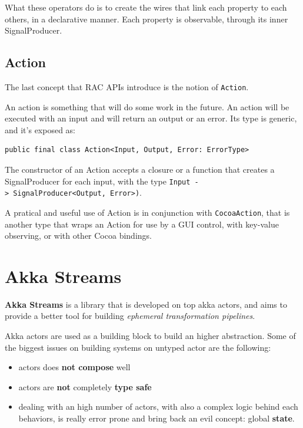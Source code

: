 What these operators do is to create the wires that link each property
to each others, in a declarative manner. Each property is observable,
through its inner SignalProducer.


\subsection{Action}\label{action}

The last concept that RAC APIs introduce is the notion of
\texttt{Action}.

An action is something that will do some work in the future. An action
will be executed with an input and will return an output or an error.
Its type is generic, and it's exposed as:

\begin{verbatim}
public final class Action<Input, Output, Error: ErrorType>
\end{verbatim}

The constructor of an Action accepts a closure or a function that
creates a SignalProducer for each input, with the type
\texttt{Input\ -\textgreater{}\ SignalProducer\textless{}Output,\ Error\textgreater{})}.

A pratical and useful use of Action is in conjunction with
\texttt{CocoaAction}, that is another type that wraps an Action for use
by a GUI control, with key-value observing, or with other Cocoa
bindings.


\section{Akka Streams}\label{akka-streams}

\textbf{Akka Streams} is a library that is developed on top akka actors,
and aims to provide a better tool for building \emph{ephemeral
transformation pipelines}.

Akka actors are used as a building block to build an higher abstraction.
Some of the biggest issues on building systems on untyped actor are the
following:

\begin{itemize}
\itemsep1pt\parskip0pt
\item
  actors does \textbf{not compose} well
\item
  actors are \textbf{not} completely \textbf{type safe}
\item
  dealing with an high number of actors, with also a complex logic
  behind each behaviors, is really error prone and bring back an evil
  concept: global \textbf{state}.
\end{itemize}

